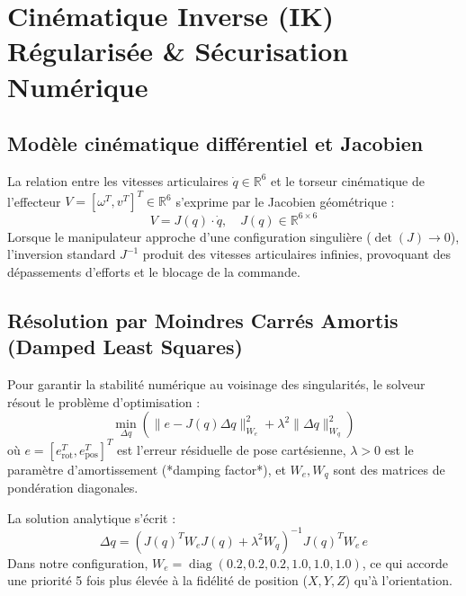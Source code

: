 \documentclass[11pt,a4paper]{report}
\begin{document}
\chapter{Cinématique Inverse (IK) Régularisée \& Sécurisation Numérique}

\section{Modèle cinématique différentiel et Jacobien}
La relation entre les vitesses articulaires $\dot{q} \in \mathbb{R}^6$ et le torseur cinématique de l'effecteur $V = [\omega^T, v^T]^T \in \mathbb{R}^6$ s'exprime par le Jacobien géométrique :
\begin{equation}
    V = J(q) \cdot \dot{q}, \quad J(q) \in \mathbb{R}^{6 \times 6}
\end{equation}
Lorsque le manipulateur approche d'une configuration singulière ($\det(J) \to 0$), l'inversion standard $J^{-1}$ produit des vitesses articulaires infinies, provoquant des dépassements d'efforts et le blocage de la commande.

\section{Résolution par Moindres Carrés Amortis (Damped Least Squares)}
Pour garantir la stabilité numérique au voisinage des singularités, le solveur résout le problème d'optimisation :
\begin{equation}
    \min_{\Delta q} \left( \| e - J(q)\Delta q \|_{W_e}^2 + \lambda^2 \|\Delta q\|_{W_q}^2 \right)
\end{equation}
où $e = [e_{\text{rot}}^T, e_{\text{pos}}^T]^T$ est l'erreur résiduelle de pose cartésienne, $\lambda > 0$ est le paramètre d'amortissement (*damping factor*), et $W_e, W_q$ sont des matrices de pondération diagonales.

La solution analytique s'écrit :
\begin{equation}
    \Delta q = \left( J(q)^T W_e J(q) + \lambda^2 W_q \right)^{-1} J(q)^T W_e \, e
\end{equation}
Dans notre configuration, $W_e = \operatorname{diag}(0.2, 0.2, 0.2, 1.0, 1.0, 1.0)$, ce qui accorde une priorité 5 fois plus élevée à la fidélité de position ($X, Y, Z$) qu'à l'orientation.
\end{document}

